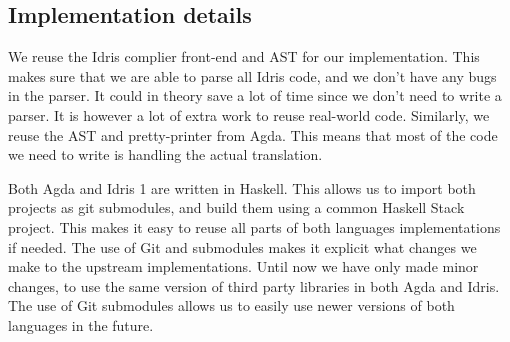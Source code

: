 \documentclass[parskip=half]{scrartcl}
\begin{document}

\subsection{Implementation details}
We reuse the Idris complier front-end and AST for our implementation. This
makes sure that we are able to parse all Idris code, and we don't have any bugs
in the parser. It could in theory save a lot of time since we don't need to
write a parser. It is however a lot of extra work to reuse real-world code.
Similarly, we reuse the AST and pretty-printer from Agda. This means
that most of the code we need to write is handling the actual translation.

Both Agda and Idris 1 are written in Haskell. This allows us to import both
projects as git submodules, and build them using a common Haskell Stack
project. This makes it easy to reuse all parts of both languages
implementations if needed. The use of Git and submodules makes it explicit what
changes we make to the upstream implementations. Until now we have only made
minor changes, to use the same version of third party libraries in both
Agda and Idris. The use of Git submodules allows us to easily use newer
versions of both languages in the future.



\end{document}

